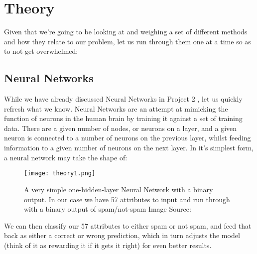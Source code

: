 \documentclass{article}
\begin{document}
\section{Theory}
Given that we're going to be looking at and weighing a set of different methods and how they relate to our problem, let us run through them one at a time so as to not get overwhelmed:
\subsection{Neural Networks}
While we have already discussed Neural Networks in Project 2 \cite{proj2}, let us quickly refresh what we know. \newline
Neural Networks are an attempt at mimicking the function of neurons in the human brain by training it against a set of training data. There are a given number of nodes, or neurons on a layer, and a given neuron is connected to a number of neurons on the previous layer, whilst feeding information to a given number of neurons on the next layer. \newline In it's simplest form, a neural network may take the shape of:
\begin{figure}[ht!]
    \centering
    \texttt{[image: theory1.png]}
    \caption{A very simple one-hidden-layer Neural Network with a binary output. \newline
    In our case we have 57 attributes to input and run through with a binary output of spam/not-spam \newline
    Image Source: \cite{neuralimg1}}
    \label{fig1}
\end{figure} \newline
We can then classify our 57 attributes to either spam or not spam, and feed that back as either a correct or wrong prediction, which in turn adjusts the model (think of it as rewarding it if it gets it right) for even better results.
\end{document}
